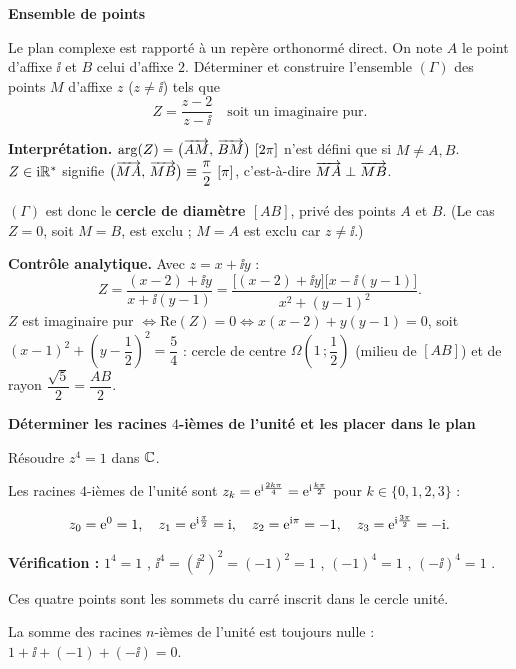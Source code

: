 \exerciceresolu
\textbf{Ensemble de points}

Le plan complexe est rapporté à un repère orthonormé direct. On note $A$ le
point d'affixe $\ii$ et $B$ celui d'affixe $2$. Déterminer et construire
l'ensemble $(\Gamma)$ des points $M$ d'affixe $z$ ($z \neq \ii$) tels que
$$
Z = \frac{z - 2}{z - \ii} \quad \text{soit un imaginaire pur.}
$$

\solution

\textbf{Interprétation.} $\arg(Z) =\bigl(\overrightarrow{AM},\,\overrightarrow{BM}\bigr)\ [2\pi]$ n'est défini que si
$M \neq A, B$. $Z \in \mathrm{i}\mathbb{R}^*$ signifie
$\bigl(\overrightarrow{MA},\,\overrightarrow{MB}\bigr) \equiv \dfrac{\pi}{2}\ [\pi]$, c'est-à-dire
$\overrightarrow{MA} \perp \overrightarrow{MB}$.

$(\Gamma)$ est donc le \textbf{cercle de diamètre $[AB]$}, privé des points $A$
et $B$. (Le cas $Z = 0$, soit $M = B$, est exclu ; $M = A$ est exclu car
$z \neq \ii$.)

\textbf{Contrôle analytique.} Avec $z = x + \ii y$ :
$$
Z = \frac{(x - 2) + \ii y}{x + \ii(y - 1)}
= \frac{\bigl[(x-2) + \ii y\bigr]\bigl[x - \ii(y-1)\bigr]}{x^2 + (y-1)^2}.
$$
$Z$ est imaginaire pur $\iff \mathrm{Re}(Z) = 0 \iff x(x - 2) + y(y - 1) = 0$,
soit $\left(x - 1\right)^2 + \left(y - \dfrac12\right)^2 = \dfrac54$ : cercle de
centre $\Omega\!\left(1\,;\dfrac12\right)$ (milieu de $[AB]$) et de rayon
$\dfrac{\sqrt5}{2} = \dfrac{AB}{2}$.



\exerciceresolu
\textbf{Déterminer les racines $4$-ièmes de l'unité et les placer dans le plan}

Résoudre $z^4 = 1$ dans $\mathbb{C}$.

\solution

Les racines $4$-ièmes de l'unité sont $z_k = \mathrm{e}^{\mathrm{i}\frac{2k\pi}{4}} = \mathrm{e}^{\mathrm{i}\frac{k\pi}{2}}$
pour $k \in \{0, 1, 2, 3\}$ :

$$
z_0 = \mathrm{e}^{0} = 1, \quad
z_1 = \mathrm{e}^{\mathrm{i}\frac{\pi}{2}} = \mathrm{i}, \quad
z_2 = \mathrm{e}^{\mathrm{i}\pi} = -1, \quad
z_3 = \mathrm{e}^{\mathrm{i}\frac{3\pi}{2}} = -\mathrm{i}.
$$

\textbf{Vérification :} $1^4 = 1$ \checkmark, $\ii^4 = (\ii^2)^2 = (-1)^2 = 1$ \checkmark,
$(-1)^4 = 1$ \checkmark, $(-\ii)^4 = 1$ \checkmark.

Ces quatre points sont les sommets du carré inscrit dans le cercle unité.

\remarque
La somme des racines $n$-ièmes de l'unité est toujours nulle :
$1 + \ii + (-1) + (-\ii) = 0$. \checkmark


